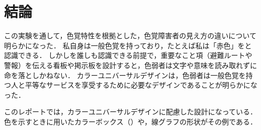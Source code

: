 \section{結論}
この実験を通して，色覚特性を根拠とした，色覚障害者の見え方の違いについて明らかになった．
私自身は一般色覚を持っており，たとえば私は「赤色」をと認識できる．
しかしを誰しも認識できる前提で，重要なこと項（避難ルートや警報）を伝える看板や掲示板を設計すると，色弱者は文字や意味を読み取れずに命を落としかねない．
カラーユニバーサルデザインは，色弱者は一般色覚を持つ人と平等なサービスを享受するために必要なデザインであることが明らかになった．\par
このレポートでは，カラーユニバーサルデザインに配慮した設計になっている．色を示すときに用いたカラーボックス（）や，線グラフの形状がその例である．